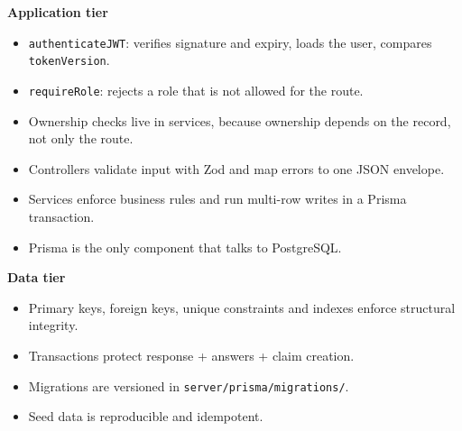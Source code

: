 \documentclass[12pt,a4paper]{article}
\begin{document}
\textbf{Application tier}

\begin{itemize}[leftmargin=*]
\item \texttt{authenticateJWT}: verifies signature and expiry, loads the user, compares \texttt{tokenVersion}.
\item \texttt{requireRole}: rejects a role that is not allowed for the route.
\item Ownership checks live in services, because ownership depends on the record, not only the route.
\item Controllers validate input with Zod and map errors to one JSON envelope.
\item Services enforce business rules and run multi-row writes in a Prisma transaction.
\item Prisma is the only component that talks to PostgreSQL.
\end{itemize}

\textbf{Data tier}

\begin{itemize}[leftmargin=*]
\item Primary keys, foreign keys, unique constraints and indexes enforce structural integrity.
\item Transactions protect response + answers + claim creation.
\item Migrations are versioned in \texttt{server/prisma/migrations/}.
\item Seed data is reproducible and idempotent.
\end{itemize}

\end{document}
